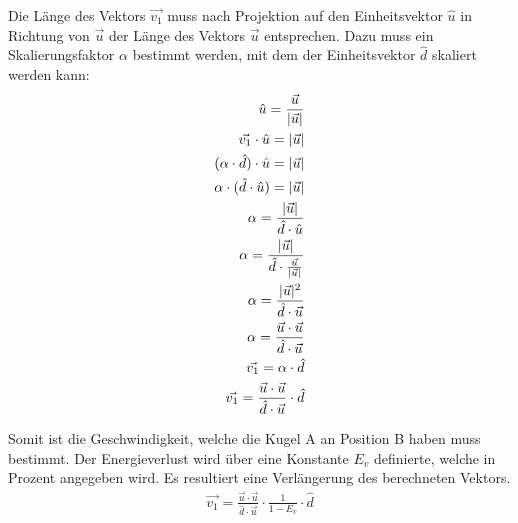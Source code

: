 Die Länge des Vektors $\vec{v_1}$ muss nach Projektion auf den Einheitsvektor $\hat{u}$ in Richtung
von $\vec{u}$ der Länge des Vektors $\vec{u}$ entsprechen. Dazu muss ein Skalierungsfaktor $\alpha$ bestimmt werden,
mit dem der Einheitsvektor $\hat{d}$ skaliert werden kann:
\begin{align}
    \hat{u} = \frac{\vec{u}}{\lvert \vec{u} \rvert}\\
    \vec{v_1} \cdot \hat{u} = \lvert \vec{u} \rvert\\
    (\alpha \cdot \hat{d}) \cdot \hat{u} = \lvert \vec{u} \rvert\\
    \alpha \cdot (\hat{d} \cdot \hat{u}) = \lvert \vec{u} \rvert\\
    \alpha = \frac{\lvert \vec{u} \rvert}{\hat{d} \cdot \hat{u}}\\
    \alpha = \frac{\lvert \vec{u} \rvert}{\hat{d} \cdot \frac{\vec{u}}{\lvert \vec{u} \rvert}}\\
    \alpha = \frac{\lvert \vec{u} \rvert^2}{\hat{d} \cdot \vec{u}}\\
    \alpha = \frac{\vec{u} \cdot \vec{u}}{\hat{d} \cdot \vec{u}}\\
    \vec{v_1} = \alpha \cdot \hat{d}\\
    \vec{v_1} = \frac{\vec{u} \cdot \vec{u}}{\hat{d} \cdot \vec{u}} \cdot \hat{d}
\end{align}

Somit ist die Geschwindigkeit, welche die Kugel A an Position B haben muss bestimmt.
Der Energieverlust wird über eine Konstante $E_v$ definierte, welche in Prozent angegeben wird.
Es resultiert eine Verlängerung des berechneten Vektors.
\begin{align}
    \vec{v_1} = \frac{\vec{u} \cdot \vec{u}}{\hat{d} \cdot \vec{u}} \cdot \frac{1}{1 - E_v} \cdot \hat{d}
\end{align}